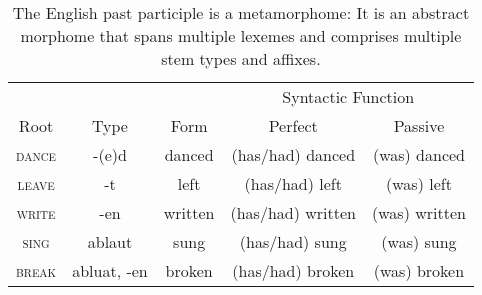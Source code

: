 \begin{table}[!t]
\begin{mdframed}
\centering
\setlength{\extrarowheight}{8pt}
\begin{tabular}{c c c c c}
\toprule
& & & \multicolumn{2}{c}{Syntactic Function} \\[-1ex] 
Root & Type & Form & Perfect & Passive  \\ [0.5ex]
\midrule
\textsc{dance} & -(e)d & danced & (has/had) danced & (was) danced \\
\textsc{leave} & -t & left & (has/had) left & (was) left \\ 
\textsc{write} & -en & written & (has/had) written & (was) written \\
\textsc{sing} & ablaut & sung & (has/had) sung & (was) sung \\
\textsc{break} & abluat, -en & broken & (has/had) broken & (was) broken \\
\bottomrule
\end{tabular}
\caption{The English past participle is a metamorphome: It is an abstract morphome that spans multiple lexemes and comprises multiple stem types and affixes.}
\label{tab:engpastpart}
\end{mdframed}
\end{table}

